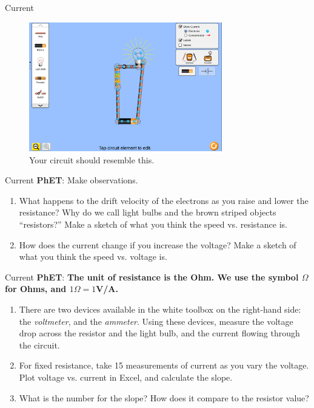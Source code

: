 \documentclass{beamer}
\begin{document}
\begin{frame}{Current}
\begin{figure}
\centering
\includegraphics[width=0.75\textwidth]{figures/PhETBulb.png}
\caption{\label{fig:phetb} Your circuit should resemble this.}
\end{figure}
\end{frame}

\begin{frame}{Current}
\textbf{\alert{PhET}}: Make observations.
\begin{enumerate}
\item What happens to the drift velocity of the electrons as you raise and lower the resistance?  Why do we call light bulbs and the brown striped objects ``resistors?''  Make a sketch of what you think the speed vs. resistance is.
\item How does the current change if you increase the voltage? Make a sketch of what you think the speed vs. voltage is.
\end{enumerate}
\end{frame}

\begin{frame}{Current}
\textbf{\alert{PhET}}: \textbf{The unit of resistance is the Ohm.  We use the symbol $\Omega$ for Ohms, and $1\Omega = 1$V/A.}
\begin{enumerate}
\item There are two devices available in the white toolbox on the right-hand side: the \textit{voltmeter}, and the \textit{ammeter}.  Using these devices, measure the voltage drop across the resistor and the light bulb, and the current flowing through the circuit.
\item For fixed resistance, take 15 measurements of current as you vary the voltage.  Plot voltage vs. current in Excel, and calculate the slope.
\item What is the number for the slope?  How does it compare to the resistor value?
\end{enumerate}
\end{frame}
\end{document}
